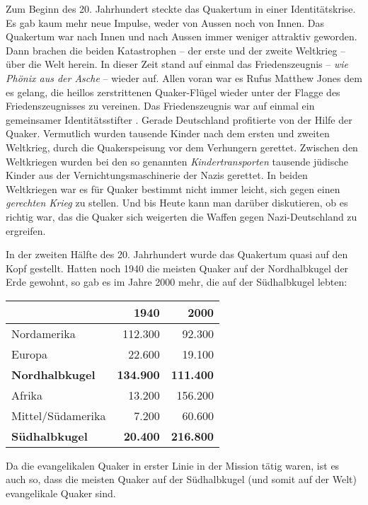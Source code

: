 Zum Beginn des 20. Jahrhundert steckte das Quakertum in einer Identitätskrise.
Es gab kaum mehr neue Impulse, weder von Aussen noch von Innen. Das Quakertum
war
nach Innen und nach Aussen immer weniger attraktiv geworden. Dann brachen die
beiden Katastrophen -- der erste und der zweite Weltkrieg --
über die Welt
herein. In dieser Zeit stand auf einmal das Friedenszeugnis
 -- \textit{wie
Phönix aus der Asche} -- wieder auf. Allen voran war es Rufus Matthew Jones
 dem
es gelang, die heillos zerstrittenen Quaker-Flügel wieder unter der Flagge des
Friedenszeugnisses zu vereinen. Das Friedenszeugnis war auf einmal ein
gemeinsamer Identitätsstifter . Gerade Deutschland
 profitierte von der Hilfe der
Quaker. Vermutlich wurden tausende Kinder nach dem ersten und zweiten Weltkrieg,
durch die Quakerspeisung  vor dem Verhungern gerettet.
Zwischen den Weltkriegen
wurden bei den so genannten \textit{Kindertransporten} 
tausende jüdische Kinder 
aus der Vernichtungsmaschinerie der Nazis gerettet. In beiden Weltkriegen war es
für Quaker bestimmt nicht immer leicht, sich gegen einen \textit{gerechten
Krieg} zu stellen. Und bis Heute kann man darüber diskutieren, ob es richtig
war, das die Quaker sich weigerten die Waffen gegen Nazi-Deutschland zu
ergreifen.

\medskip

In der zweiten Hälfte des 20. Jahrhundert wurde das Quakertum quasi auf den Kopf
gestellt. Hatten noch 1940 die meisten Quaker auf der Nordhalbkugel der Erde
gewohnt, so gab es im Jahre 2000 mehr, die auf der Südhalbkugel lebten:

\begin{center}
\begin{tabular}{|l|r|r|} \hline
                        & \textbf{1940}        & \textbf{2000}    \\ \hline
\hline
Nordamerika             & 112.300              & 92.300           \\ \hline
Europa                  & 22.600               & 19.100           \\ \hline
\textbf{Nordhalbkugel}  & \textbf{134.900}     & \textbf{111.400} \\ \hline
Afrika                  & 13.200               & 156.200          \\ \hline
Mittel/Südamerika       & 7.200                & 60.600           \\ \hline
\textbf{Südhalbkugel}   & \textbf{20.400}      & \textbf{216.800} \\ \hline
\end{tabular}
\end{center}


Da die evangelikalen Quaker in erster Linie in der Mission tätig waren, ist es
auch so, dass die meisten Quaker auf der Südhalbkugel (und somit auf der Welt)
evangelikale Quaker sind.